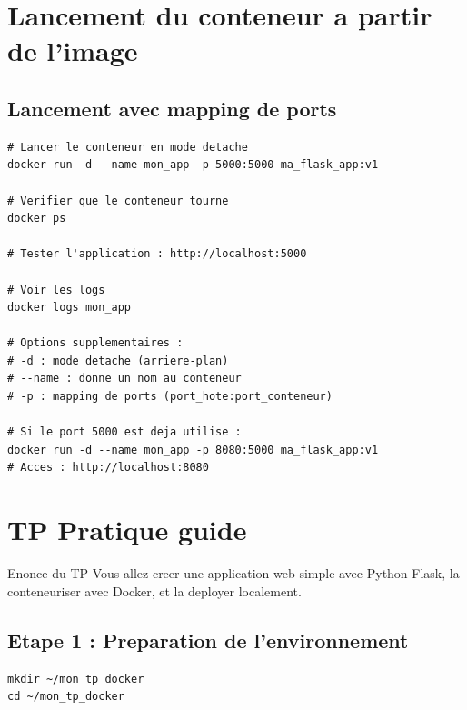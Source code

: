 \documentclass[a4paper,12pt]{article}
\begin{document}
\section{Lancement du conteneur a partir de l'image}

\subsection{Lancement avec mapping de ports}
\begin{lstlisting}[caption=Lancer le conteneur Flask]
# Lancer le conteneur en mode detache
docker run -d --name mon_app -p 5000:5000 ma_flask_app:v1

# Verifier que le conteneur tourne
docker ps

# Tester l'application : http://localhost:5000

# Voir les logs
docker logs mon_app

# Options supplementaires :
# -d : mode detache (arriere-plan)
# --name : donne un nom au conteneur
# -p : mapping de ports (port_hote:port_conteneur)

# Si le port 5000 est deja utilise :
docker run -d --name mon_app -p 8080:5000 ma_flask_app:v1
# Acces : http://localhost:8080
\end{lstlisting}

\section{TP Pratique guide}

\begin{importantbox}{Enonce du TP}
Vous allez creer une application web simple avec Python Flask, la conteneuriser avec Docker, et la deployer localement.
\end{importantbox}

\subsection{Etape 1 : Preparation de l'environnement}
\begin{lstlisting}[caption=Creer le dossier du projet]
mkdir ~/mon_tp_docker
cd ~/mon_tp_docker
\end{lstlisting}
\end{document}
